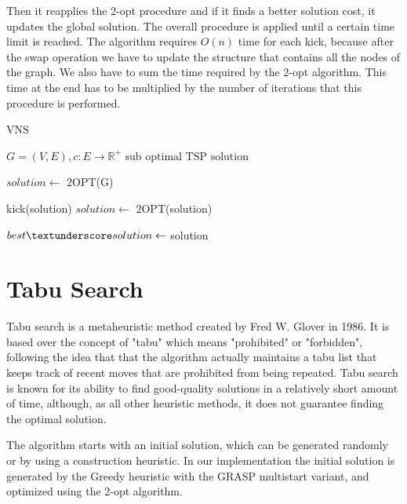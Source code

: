 Then it reapplies the 2-opt procedure and if it finds a better solution cost, it updates the global solution.
The overall procedure is applied until a certain time limit is reached.
The algorithm requires $O(n)$ time for each kick, because after the swap operation we have to update the structure that contains all the nodes of the graph. We also have to sum the time required by the 2-opt algorithm. This time at the end has to be multiplied by the number of iterations that this procedure is performed. 

\begin{algorithm}[h!]
    \caption{VNS}\label{algo:VNS}
    \begin{algorithmic}[1]
    \Require $G = (V,E), c:E \to \mathbb{R}^+$
    \Ensure $\text{sub optimal TSP solution}$


    \State $solution \gets$ 2OPT(G)
   
   
    \State kick(solution)   
    \State $ solution \gets $ 2OPT(solution)
    
    
    \State $ best\textunderscore solution \gets$ solution
    \EndIf
    

    \EndWhile

    \end{algorithmic}
\end{algorithm}





\section{Tabu Search}
Tabu search is a metaheuristic method created by Fred W. Glover in 1986.
It is based over the concept of "tabu" which means "prohibited" or "forbidden", following the idea that that the algorithm actually maintains a tabu list that keeps track of recent moves that are prohibited from being repeated. 
Tabu search is known for its ability to find good-quality solutions in a relatively short amount of time, although, as all other heuristic methods, it does not guarantee finding the optimal solution.

The algorithm starts with an initial solution, which can be generated randomly or by using a construction heuristic. In our implementation the initial solution is generated by the Greedy heuristic with the GRASP multistart variant, and optimized using the 2-opt algorithm.

